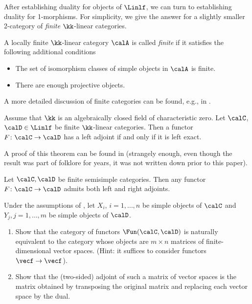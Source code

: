  After establishing duality for objects of $\Linlf$, we can turn to establishing
 duality for 1-morphisms. For simplicity, we give the answer for a slightly
 smaller 2-category of \emph{finite} $\kk$-linear categories.

 \begin{definition}\label{d:finite}
    A locally finite $\kk$-linear category $\calA$ is called \emph{finite} if
    it satisfies the following additional conditions
    \begin{itemize}
      \item The set of isomorphism classes of simple objects in $\calA$ is
        finite.
      \item There are enough projective objects.
    \end{itemize}
\end{definition}
A more detailed discussion of finite categories can be found, e.g., in
\cite[Section 1.8]{etingof-fusion}.

 \begin{theorem}\label{t:exact-adjoint}
  Assume that $\kk$ is an algebraically closed field of characteristic zero. Let
  $\calC$, $\calD\in \Linlf$ be finite $\kk$-linear categories. Then a functor
  $F\colon \calC\to \calD$ has a left adjoint if and only if it is left exact.
\end{theorem}
A proof of this theorem can be found in \cite[Proposition 1.7]{dsps-balanced}
(strangely enough, even though the result was part of folklore for years, it was
not written down prior to this paper).

\begin{corollary}\label{c:adjoint-semisimple}
  Let $\calC, \calD$ be finite semisimple categories. Then any functor $F\colon
  \calC\to \calD$ admits both left and right adjoints.
\end{corollary}

\begin{exercise}\label{ec:adjoint-semisimple}
  Under the assumptions of , let $X_i$, $i=1, \dots,
  n$ be simple objects of $\calC$ and $Y_j, j=1, \dots, m$ be simple objects of
  $\calD$.

  \begin{enumerate}
    \item Show that the category of functors $\Fun(\calC, \calD)$ is naturally
      equivalent to the category whose objects are $m\times n$ matrices of
    finite-dimensional vector spaces. (Hint: it suffices to consider functors
    $\vecf\to \vecf$).

    \item Show that the (two-sided) adjoint of such a matrix of vector spaces is
    the matrix obtained by transposing the original matrix and replacing each
    vector space by the dual.
  \end{enumerate}
\end{exercise}

